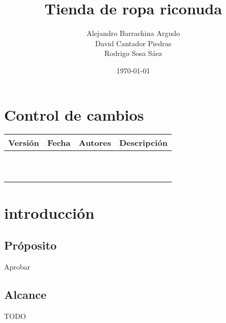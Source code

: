 \documentclass{article}
\title{Tienda de ropa riconuda}
\author{Alejandro Barrachina Argudo \\
David Cantador Piedras \\
Rodrigo Sosa Sáez }
\date{\today}
\begin{document}
\maketitle
\section*{Control de cambios} %
\noindent\begin{tabularx}{\textwidth}{ |l|l|p{5cm}|X| }
    \hline
    \textbf{Versión} & \textbf{Fecha} & \textbf{Autores} & \textbf{Descripción} \\
    \hline
                     &                &                  &                      \\
    \hline
                     &                &                  &                      \\
    \hline
                     &                &                  &                      \\
    \hline
                     &                &                  &                      \\
    \hline
                     &                &                  &                      \\
    \hline
                     &                &                  &                      \\
    \hline
                     &                &                  &                      \\
    \hline
                     &                &                  &                      \\
    \hline
                     &                &                  &                      \\
    \hline
                     &                &                  &                      \\
    \hline
\end{tabularx}


\section{introducción}
\subsection{Próposito}
Aprobar
\subsection{Alcance}
TODO
\end{document}
